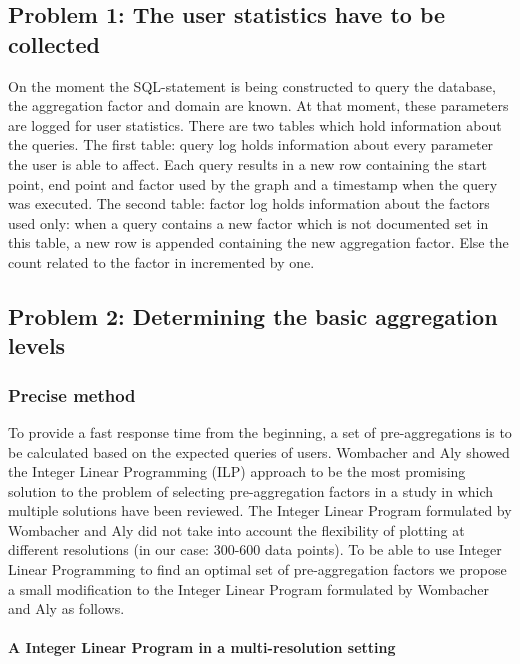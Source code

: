 \subsection{Problem 1: The user statistics have to be collected}
On the moment the SQL-statement is being constructed to query the database, the aggregation factor and domain are known. At that moment, these parameters are logged for user statistics.
There are two tables which hold information about the queries. The first table: query log holds information about every parameter the user is able to affect. Each query results in a new row containing the start point, end point and factor used by the graph and a timestamp when the query was executed. The second table: factor log holds information about the factors used only: when a query contains a new factor which is not documented set in this table, a new row is appended containing the new aggregation factor. Else the count related to the factor in incremented by one.\\

\subsection{Problem 2: Determining the basic aggregation levels}
\subsubsection{Precise method}
To provide a fast response time from the beginning, a set of pre-aggregations is to be calculated based on the expected queries of users. Wombacher and Aly \cite{wombacher2011} showed the Integer Linear Programming (ILP) approach to be the most promising solution to the problem of selecting pre-aggregation factors in a study in which multiple solutions have been reviewed. The Integer Linear Program formulated by Wombacher and Aly \cite{wombacher2011} did not take into account the flexibility of plotting at different resolutions (in our case: 300-600 data points). To be able to use Integer Linear Programming to find an optimal set of pre-aggregation factors we propose a small modification to the Integer Linear Program formulated by Wombacher and Aly \cite{wombacher2011} as follows.
\paragraph{A Integer Linear Program in a multi-resolution setting}

